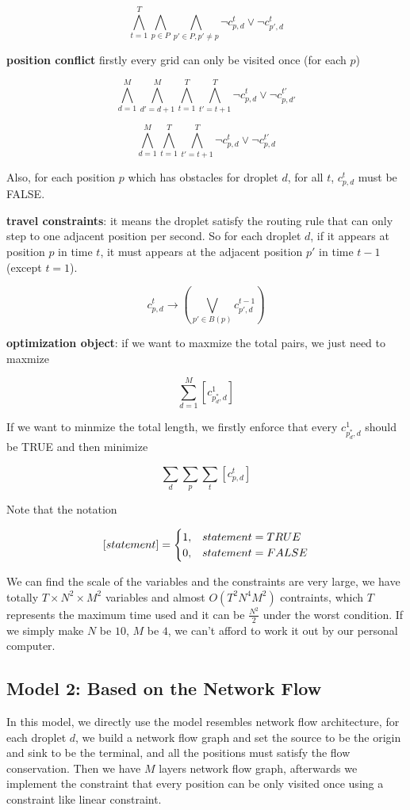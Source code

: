 \documentclass[twocolumn]{article}
\begin{document}
\[
\bigwedge_{t=1}^{T} \bigwedge_{p \in P} \bigwedge_{p' \in P, p' \neq p} \neg c_{p, d}^t \vee \neg c_{p', d}^t
\]

\textbf{position conflict} firstly every grid can only be visited once (for each $p$)

\[
\bigwedge_{d=1}^{M} \bigwedge_{d'=d+1}^{M} \bigwedge_{t=1}^{T}  \bigwedge_{t'=t+1}^{T} \neg c_{p, d}^t \vee \neg c_{p, d'}^{t'}
\]

\[
\bigwedge_{d=1}^{M} \bigwedge_{t=1}^{T}  \bigwedge_{t'=t+1}^{T} \neg c_{p, d}^t \vee \neg c_{p, d}^{t'}
\]

Also, for each position $p$ which has obstacles for droplet $d$, for all $t$, $c_{p, d}^t$ must be FALSE.

\textbf{travel constraints}: it means the droplet satisfy the routing rule that can only step to one adjacent position per second. So for each droplet $d$, if it appears at position $p$ in time $t$, it must appears at the adjacent position $p'$ in time $t-1$ (except $t=1$).

\[
c_{p, d}^t \to (\bigvee_{p' \in B(p)} c_{p', d}^{t-1})
\]

\textbf{optimization object}: if we want to maxmize the total pairs, we just need to maxmize

\[
\sum_{d=1}^{M}{[c_{p^*_d,d}^1]}
\]

If we want to minmize the total length, we firstly enforce that every $c_{p^*_d,d}^1$ should be TRUE and then minimize

\[
\sum_{d}\sum_{p}\sum_{t}{[c_{p,d}^t]}
\]

Note that the notation

\[
[statement] = \begin{cases} 1, &statement = TRUE\cr 0, &statement = FALSE\end{cases}
\]

We can find the scale of the variables and the constraints are very large, we have totally $T \times N^2 \times M^2$ variables and almost $O(T^2 N^4 M^2)$ contraints, which $T$ represents the maximum time used and it can be $\frac{N^2}{2}$ under the worst condition. If we simply make $N$ be $10$, $M$ be $4$, we can't afford to work it out by our personal computer.

\subsection{Model 2: Based on the Network Flow}

In this model, we directly use the model resembles network flow architecture, for each droplet $d$, we build a network flow graph and set the source to be the origin and sink to be the terminal, and all the positions must satisfy the flow conservation. Then we have $M$ layers network flow graph, afterwards we implement the constraint that every position can be only visited once using a constraint like linear constraint.
\end{document}
